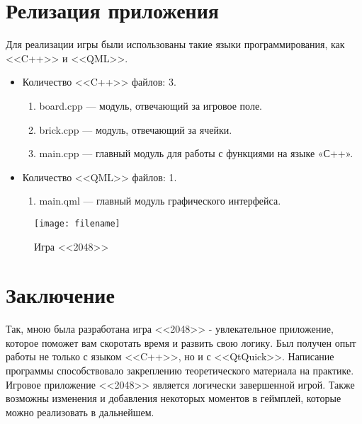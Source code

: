 \documentclass[a4paper,12pt]{article}
\begin{document}
\section{Релизация приложения}
Для реализации игры были использованы такие языки программирования, как <<C++>> и <<QML>>. 
\begin{itemize}
    \item Количество <<C++>> файлов: 3.
    \begin{enumerate}
        \item board.cpp --- модуль, отвечающий за игровое поле.
        \item brick.cpp --- модуль, отвечающий за ячейки.
        \item main.cpp --- главный модуль для работы с функциями на языке «С++».
    \end{enumerate}
    \item Количество <<QML>> файлов: 1.
    \begin{enumerate}
        \item main.qml --- главный модуль графического интерфейса.
    \end{enumerate}

\end{itemize}

\begin{figure}[ht!]
\centering
\texttt{[image: filename]}
\caption{Игра <<2048>>}
\label{fig:filename}
\end{figure}


\newpage


\section*{Заключение}

Так, мною была разработана игра <<2048>> - увлекательное приложение, которое поможет вам скоротать время и развить свою логику. Был получен  опыт работы не только с языком <<C++>>, но и с <<QtQuick>>. Написание программы способствовало закреплению теоретического материала на практике.\\

Игровое приложение <<2048>> является логически завершенной игрой. Также возможны изменения и добавления некоторых моментов в геймплей, которые можно реализовать в дальнейшем.
\end{document}
